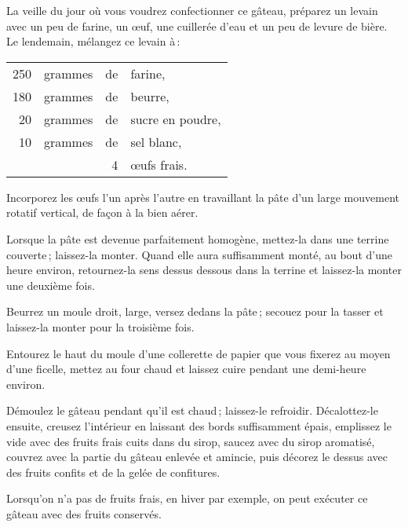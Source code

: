 La veille du jour où vous voudrez confectionner ce gâteau, préparez un levain
avec un peu de farine, un œuf, une cuillerée d’eau et un peu de levure de
bière. Le lendemain, mélangez ce levain à :

\footnotesize
\begin{longtable}{rrrp{16em}}
    250 & grammes & de & farine,                                                                          \\
    180 & grammes & de & beurre,                                                                          \\
     20 & grammes & de & sucre en poudre,                                                                 \\
     10 & grammes & de & sel blanc,                                                                       \\
        &         &  4 & œufs frais.                                                                      \\
\end{longtable}
\normalsize

Incorporez les œufs l'un après l'autre en travaillant la pâte d'un large
mouvement rotatif vertical, de façon à la bien aérer.

Lorsque la pâte est devenue parfaitement homogène, mettez-la dans une terrine
couverte ; laissez-la monter. Quand elle aura suffisamment monté, au bout d'une
heure environ, retournez-la sens dessus dessous dans la terrine et laissez-la monter
une deuxième fois.

Beurrez un moule droit, large, versez dedans la pâte ; secouez pour la tasser
et laissez-la monter pour la troisième fois.

Entourez le haut du moule d'une collerette de papier que vous fixerez au moyen
d'une ficelle, mettez au four chaud et laissez cuire pendant une demi-heure
environ.

Démoulez le gâteau pendant qu'il est chaud ; laissez-le refroidir.
Décalottez-le ensuite, creusez l'intérieur en laissant des bords suffisamment
épais, emplissez le vide avec des fruits frais cuits dans du sirop, saucez avec
du sirop aromatisé, couvrez avec la partie du gâteau enlevée et amincie, puis
décorez le dessus avec des fruits confits et de la gelée de confitures.

\sk

Lorsqu'on n'a pas de fruits frais, en hiver par exemple, on peut exécuter ce
gâteau avec des fruits conservés.

